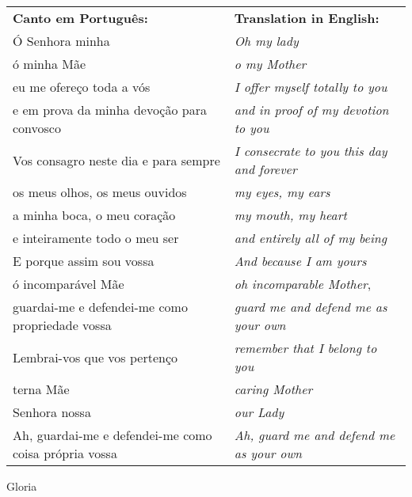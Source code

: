 \begin{longtable}{L{2in}R{2in}}
  {\bf Canto em Português:}&{\bf Translation in English:}\\
  
  Ó Senhora minha & {\it Oh my lady} \\  
	ó minha Mãe & {\it o my Mother} \\
	eu me ofereço toda a vós & {\it I offer myself totally to you}\\ 
  e em prova da minha devoção para convosco & {\it and in proof of my devotion to you}\\
  Vos consagro neste dia e para sempre & {\it I consecrate to you this day and forever}\\
  os meus olhos, os meus ouvidos & {\it my eyes, my ears}\\
  a minha boca, o meu coração & {\it my mouth, my heart}\\
  e inteiramente todo o meu ser & {\it and entirely all of my being}\\
  E porque assim sou vossa & {\it And because I am yours}\\
  ó incomparável Mãe & {\it oh incomparable Mother}, \\ 
  guardai-me e defendei-me como propriedade vossa & {\it guard me and defend me as your own}\\
  Lembrai-vos que vos pertenço & {\it remember that I belong to you}\\
  terna Mãe & {\it caring Mother}\\ 
  Senhora nossa & {\it our Lady}\\
  Ah, guardai-me e defendei-me como coisa própria vossa & {\it Ah, guard me and defend me as your own}\\
  \end{longtable}

  \newpage

{\large Gloria}

